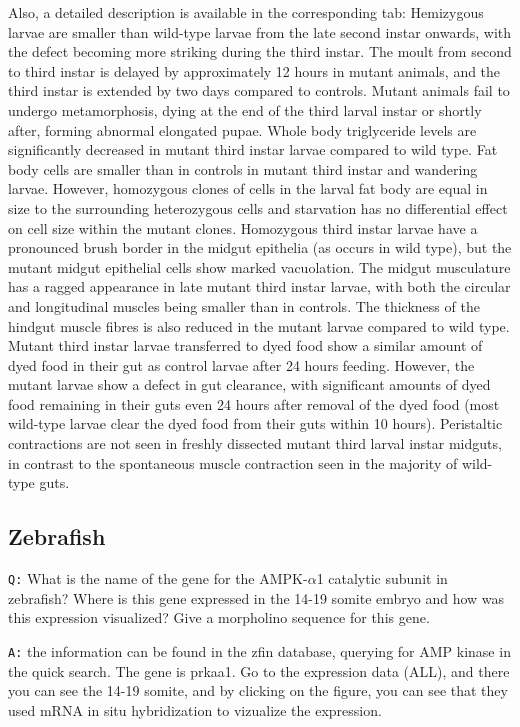 \documentclass[11pt, a4paper,titlepage]{article}
\begin{document}
\noindent Also, a detailed description is available in the
corresponding tab: Hemizygous larvae are smaller than wild-type larvae
from the late second instar onwards, with the defect becoming more
striking during the third instar. The moult from second to third
instar is delayed by approximately 12 hours in mutant animals, and the
third instar is extended by two days compared to controls. Mutant
animals fail to undergo metamorphosis, dying at the end of the third
larval instar or shortly after, forming abnormal elongated
pupae. Whole body triglyceride levels are significantly decreased in
mutant third instar larvae compared to wild type. Fat body cells are
smaller than in controls in mutant third instar and wandering
larvae. However, homozygous clones of cells in the larval fat body are
equal in size to the surrounding heterozygous cells and starvation has
no differential effect on cell size within the mutant
clones. Homozygous third instar larvae have a pronounced brush border
in the midgut epithelia (as occurs in wild type), but the mutant
midgut epithelial cells show marked vacuolation. The midgut
musculature has a ragged appearance in late mutant third instar
larvae, with both the circular and longitudinal muscles being smaller
than in controls. The thickness of the hindgut muscle fibres is also
reduced in the mutant larvae compared to wild type. Mutant third
instar larvae transferred to dyed food show a similar amount of dyed
food in their gut as control larvae after 24 hours feeding. However,
the mutant larvae show a defect in gut clearance, with significant
amounts of dyed food remaining in their guts even 24 hours after
removal of the dyed food (most wild-type larvae clear the dyed food
from their guts within 10 hours). Peristaltic contractions are not
seen in freshly dissected mutant third larval instar midguts, in
contrast to the spontaneous muscle contraction seen in the majority of
wild-type guts.

\subsection*{Zebrafish}

\texttt{Q:} What is the name of the gene for the AMPK-$\alpha$1
catalytic subunit in zebrafish? Where is this gene expressed in the
14-19 somite embryo and how was this expression visualized? Give a
morpholino sequence for this gene. 
\smallskip

\noindent\texttt{A:} the information can be found in the zfin
database, querying for AMP kinase in the quick search. The gene is
prkaa1. Go to the expression data (ALL), and there you can see the
14-19 somite, and by clicking on the figure, you can see that they
used mRNA in situ hybridization to vizualize the expression.
\end{document}
